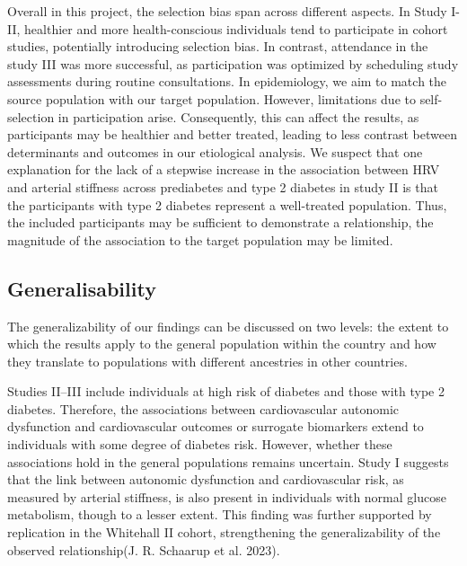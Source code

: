 \documentclass[
  a4paper,
  headsepline=true,
  open=any]{scrbook}
\begin{document}
Overall in this project, the selection bias span across different
aspects. In Study I-II, healthier and more health-conscious individuals
tend to participate in cohort studies, potentially introducing selection
bias. In contrast, attendance in the study III was more successful, as
participation was optimized by scheduling study assessments during
routine consultations. In epidemiology, we aim to match the source
population with our target population. However, limitations due to
self-selection in participation arise. Consequently, this can affect the
results, as participants may be healthier and better treated, leading to
less contrast between determinants and outcomes in our etiological
analysis. We suspect that one explanation for the lack of a stepwise
increase in the association between HRV and arterial stiffness across
prediabetes and type 2 diabetes in study II is that the participants
with type 2 diabetes represent a well-treated population. Thus, the
included participants may be sufficient to demonstrate a relationship,
the magnitude of the association to the target population may be
limited.

\hypertarget{generalisability}{%
\subsection{Generalisability}\label{generalisability}}

The generalizability of our findings can be discussed on two levels: the
extent to which the results apply to the general population within the
country and how they translate to populations with different ancestries
in other countries.

Studies II--III include individuals at high risk of diabetes and those
with type 2 diabetes. Therefore, the associations between cardiovascular
autonomic dysfunction and cardiovascular outcomes or surrogate
biomarkers extend to individuals with some degree of diabetes risk.
However, whether these associations hold in the general populations
remains uncertain. Study I suggests that the link between autonomic
dysfunction and cardiovascular risk, as measured by arterial stiffness,
is also present in individuals with normal glucose metabolism, though to
a lesser extent. This finding was further supported by replication in
the Whitehall II cohort, strengthening the generalizability of the
observed relationship(J. R. Schaarup et al. 2023).
\end{document}
